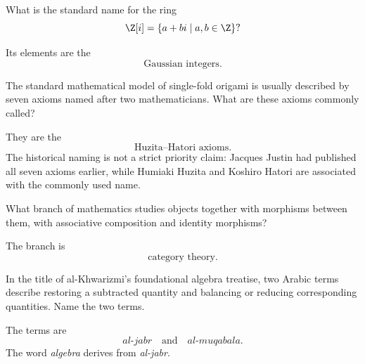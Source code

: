     \begin{expectedproblem}
        What is the standard name for the ring
        \[
            \Z[i]=\{a+bi\mid a,b\in\Z\}?
        \]
    \end{expectedproblem}

    \begin{solution}
        Its elements are the
        \[
            \boxed{\text{Gaussian integers}}.
        \]
    \end{solution}

    \begin{expectedproblem}
        The standard mathematical model of single-fold origami is usually
        described by seven axioms named after two mathematicians. What are
        these axioms commonly called?
    \end{expectedproblem}

    \begin{solution}
        They are the
        \[
            \boxed{\text{Huzita--Hatori axioms}}.
        \]
        The historical naming is not a strict priority claim: Jacques Justin
        had published all seven axioms earlier, while Humiaki Huzita and
        Koshiro Hatori are associated with the commonly used name.
    \end{solution}

    \begin{expectedproblem}
        What branch of mathematics studies objects together with morphisms
        between them, with associative composition and identity morphisms?
    \end{expectedproblem}

    \begin{solution}
        The branch is
        \[
            \boxed{\text{category theory}}.
        \]
    \end{solution}

    \begin{expectedproblem}
        In the title of al-Khwarizmi's foundational algebra treatise, two Arabic
        terms describe restoring a subtracted quantity and balancing or
        reducing corresponding quantities. Name the two terms.
    \end{expectedproblem}

    \begin{solution}
        The terms are
        \[
            \boxed{\textit{al-jabr}\quad\text{and}\quad\textit{al-muqabala}}.
        \]
        The word \emph{algebra} derives from \emph{al-jabr}.
    \end{solution}

